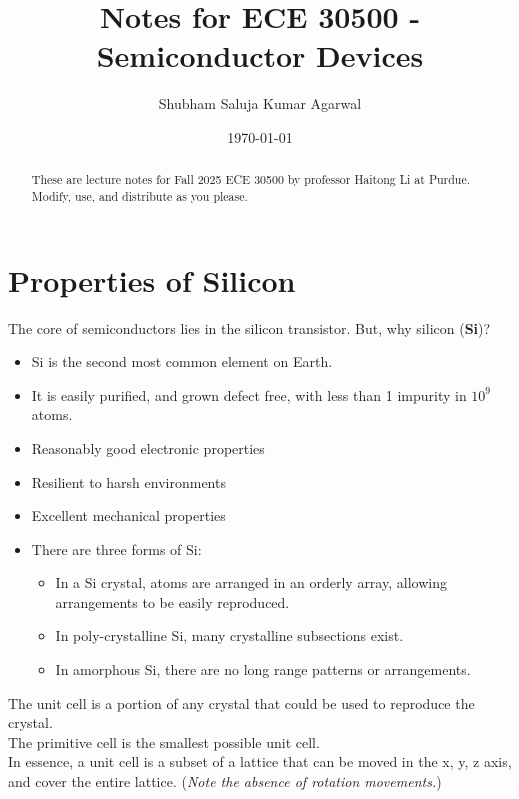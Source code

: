 \documentclass[nobib]{tufte-handout}
\title{Notes for ECE 30500 - Semiconductor Devices}
\author[Shubham Saluja Kumar Agarwal]{Shubham Saluja Kumar Agarwal}
\date{\today}  %
\begin{document}
\maketitle

\begin{abstract}
    These are lecture notes for Fall 2025 ECE 30500 by professor Haitong Li at Purdue. Modify, use, and distribute as you please.
\end{abstract}

\tableofcontents

\newpage

\section{Properties of Silicon}
The core of semiconductors lies in the silicon transistor. But, why silicon
(\textbf{Si})?\\
\begin{itemize}
    \item Si is the second most common element on Earth.
    \item It is easily purified, and grown defect free, with less than 1 impurity in
          $10^9$ atoms.
    \item Reasonably good electronic properties
    \item Resilient to harsh environments
    \item Excellent mechanical properties
    \item There are three forms of Si: \begin{itemize}
              \item In a Si crystal, atoms are arranged in an orderly array, allowing arrangements
                    to be easily reproduced.
              \item In poly-crystalline Si, many crystalline subsections exist.
              \item In amorphous Si, there are no long range patterns or arrangements.
          \end{itemize}
\end{itemize}
The unit cell is a portion of any crystal that could be used to reproduce the crystal.\\
The primitive cell is the smallest possible unit cell.\\
In essence, a unit cell is a subset of a lattice that can be moved in the x, y, z axis, and cover the entire lattice. (\textit{Note the absence of rotation movements.})\\
\end{document}
